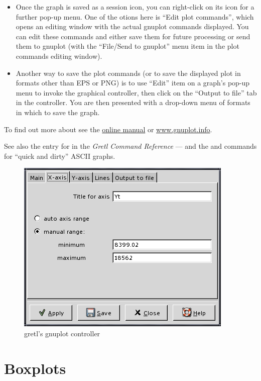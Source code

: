 \begin{itemize}
\item Once the graph is saved as a session icon, you can right-click
  on its icon for a further pop-up menu.  One of the otions here is
  ``Edit plot commands'', which opens an editing window with the
  actual gnuplot commands displayed. You can edit these commands and
  either save them for future processing or send them to gnuplot (with
  the ``File/Send to gnuplot'' menu item in the plot commands editing
  window).
\item Another way to save the plot commands (or to save the displayed
  plot in formats other than EPS or PNG) is to use ``Edit'' item on a
  graph's pop-up menu to invoke the graphical controller, then click
  on the ``Output to file'' tab in the controller.  You are then
  presented with a drop-down menu of formats in which to save the
  graph.
\end{itemize}

To find out more about  see the
\href{http://ricardo.ecn.wfu.edu/gnuplot.html}{online manual} or
\href{http://www.gnuplot.info/}{www.gnuplot.info}.

See also the entry for  in the \emph{Gretl Command
  Reference} --- and the  and  commands for
``quick and dirty'' ASCII graphs.

\begin{figure}[htbp]
  \begin{center}
    \includegraphics[scale=0.5]{figures/plot_control}
  \end{center}
  \caption{gretl's gnuplot controller}
  \label{fig-plot}
\end{figure}


\section{Boxplots}
\label{sect-boxplots}

